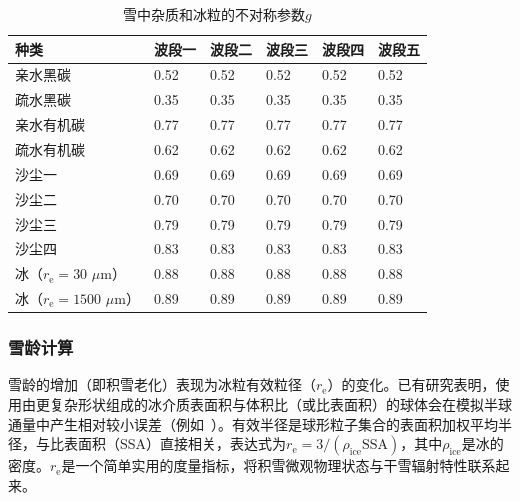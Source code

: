 \begin{table}[htbp]
  \centering
  \caption{雪中杂质和冰粒的不对称参数$g$}
  \label{tab:积雪不对称参数}
  \begin{tabular}{llllll}
    \toprule
    种类                                       & 波段一 & 波段二 & 波段三 & 波段四 & 波段五 \\ \midrule
    亲水黑碳                                   & 0.52   & 0.52   & 0.52   & 0.52   & 0.52   \\
    疏水黑碳                                   & 0.35   & 0.35   & 0.35   & 0.35   & 0.35   \\
    亲水有机碳                                 & 0.77   & 0.77   & 0.77   & 0.77   & 0.77   \\
    疏水有机碳                                 & 0.62   & 0.62   & 0.62   & 0.62   & 0.62   \\
    沙尘一                                     & 0.69   & 0.69   & 0.69   & 0.69   & 0.69   \\
    沙尘二                                     & 0.70   & 0.70   & 0.70   & 0.70   & 0.70   \\
    沙尘三                                     & 0.79   & 0.79   & 0.79   & 0.79   & 0.79   \\
    沙尘四                                     & 0.83   & 0.83   & 0.83   & 0.83   & 0.83   \\
    冰（$r_{\mathrm e}=30$ $\mu\mathrm{m}$）   & 0.88   & 0.88   & 0.88   & 0.88   & 0.88   \\
    冰（$r_{\mathrm e}=1500$ $\mu\mathrm{m}$） & 0.89   & 0.89   & 0.89   & 0.89   & 0.89   \\ \bottomrule
  \end{tabular}
\end{table}

\subsubsection{雪龄计算}\label{雪龄计算}

雪龄的增加（即积雪老化）表现为冰粒有效粒径（$r_{\mathrm e}$）的变化。已有研究表明，使用由更复杂形状组成的冰介质表面积与体积比（或比表面积）的球体会在模拟半球通量中产生相对较小误差（例如~\citet{grenfell1999RepresentationNonsphericalIce}）。有效半径是球形粒子集合的表面积加权平均半径，与比表面积（SSA）直接相关，表达式为$r_{\mathrm e}=3/(\rho_{\mathrm{ice}}\text{SSA})$，其中$\rho_{\mathrm{ice}}$是冰的密度。$r_{\mathrm e}$是一个简单实用的度量指标，将积雪微观物理状态与干雪辐射特性联系起来。

